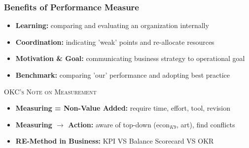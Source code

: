 \documentclass[10pt,handout,notes=show]{beamer}
\begin{document}
\begin{frame}
  \frametitle{Benefits of Performance Measure }

   \begin{itemize}
    \item \textbf{Learning:} comparing and evaluating an organization \alert{internally}
    \item \textbf{Coordination:} indicating 'weak' points and \alert{re-allocate resources}
    \item \textbf{Motivation \& Goal:} communicating business strategy to operational \alert{goal}
    \item \textbf{Benchmark:} comparing 'our' performance and adopting \alert{best practice}
  \end{itemize}

  \NextLine
  \textsc{OKC's Note on Measurement}
  \begin{itemize}
    \item \textbf{Measuring = Non-Value Added:} require \alert{time}, effort, \alert{tool}, revision
    \item \textbf{Measuring $\rightarrow$ Action:} aware of top-down (econ$_{K9}$, art), find \alert{conflicts}
    \item \textbf{RE-Method in Business:} KPI \textsc{VS} Balance Scorecard \textsc{VS} OKR
  \end{itemize}

\end{frame}
\end{document}

